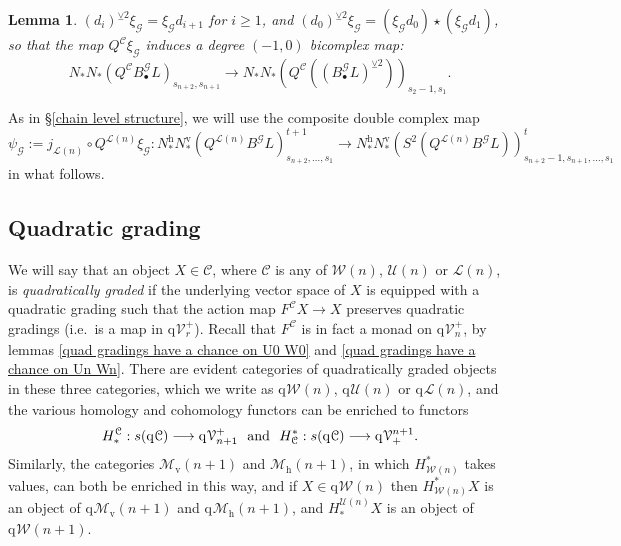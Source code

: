 \documentclass[11pt]{amsart} \renewcommand{\baselinestretch}{1.2}
\theoremstyle{plain}
\newtheorem{lem}[thm]{Lemma}
\theoremstyle{definition}
\renewcommand{\to}{\longrightarrow}
\newcommand{\scrG}{\mathscr{G}}
\newcommand{\calL}{\mathcal{L}}
\newcommand{\calV}{\mathcal{V}}
\newcommand{\calw}{\mathcal{W}}
\newcommand{\calu}{\mathcal{U}}
\newcommand{\call}{\mathcal{L}}
\newcommand{\calc}{\mathcal{C}}
\newcommand{\calMv}{\mathcal{M}\dver}
\newcommand{\calMh}{\mathcal{M}\dhor}
\newcommand{\vect}[2]{\calV^{#1}_{#2}}
\newcommand{\BSW}{{\scrG}}
\newcommand{\BSWres}{B^\BSW}%
\newcommand{\quadgrad}[1]{\mathrm{q}_{#1}}
\newcommand{\uver}{^\mathrm{v}}
\newcommand{\uhor}{^\mathrm{h}}
\newcommand{\dver}{_\mathrm{v}}
\newcommand{\dhor}{_\mathrm{h}}
\newcommand{\smashcoprod}{\veebar}%
\begin{document}
\begin{Composite functor spectral sequences}
\begin{lem}
$(d_i)^{\smashcoprod 2}\xi_\BSW =\xi_\BSW d_{i+1}$ for $i\geq1$, and $(d_0)^{\smashcoprod 2}\xi_\BSW = (\xi_\BSW d_{0})\star(\xi_\BSW d_{1})$, so that the map $Q^{\calc}\xi_\BSW $ induces a degree $(-1,0)$ bicomplex map:
\[N_*N_*(Q^{\calc}B^\BSW_{\bullet}L)_{s_{n+2},s_{n+1}}\to
  N_*N_*(Q^{\calc}((B^\BSW_{\bullet}L)^{\smashcoprod 2}))_{s_2-1,s_1}.\]
\end{lem}
As in \S\ref{chain level structure}, we will use the composite double complex map
\[\psi_\BSW:=j_{\calL(n)}\circ Q^{\calL(n)}\xi_\BSW:N\uhor_*N\uver_*(Q^{\calL(n)}\BSWres L)_{s_{n+2},\ldots,s_1}^{t+1}\to N\uhor_*N\uver_*(S^2(Q^{\calL(n)}\BSWres L))_{s_{n+2}-1,s_{n+1},\ldots,s_1}^{t}\]
in what follows.


\subsection{Quadratic grading}
\label{Quadratic grading}
We will say that an object $X\in\calc$, where $\calc$ is any of $\calw(n)$, $\calu(n)$ or $\call(n)$, is \emph{quadratically graded} if the underlying vector space of $X$ is equipped with a quadratic grading such that the action map
$F^{\calc}X\to X$ 
preserves quadratic gradings (i.e.\ is a map in $\quadgrad{}\vect{+}{r}$).
Recall that $F^{\calc}$ is in fact a monad on $\quadgrad{}\vect{+}{n}$, by lemmas \ref{quad gradings have a chance on U0 W0} and \ref{quad gradings have a chance on Un Wn}. There are evident categories of quadratically graded objects in these three categories, which we write as $\quadgrad{}\calw(n)$, $\quadgrad{}\calu(n)$ or $\quadgrad{}\call(n)$, and the various homology and cohomology functors can be enriched to functors
\[H_*^{\calc}:s(\quadgrad{}\calc)\to \quadgrad{}\vect{+}{n+1}\textup{ \ and \ }H^*_{\calc}:s(\quadgrad{}\calc)\to \quadgrad{}\vect{n+1}{+}.\]
Similarly, the categories $\calMv(n+1)$ and $\calMh(n+1)$, in which $H^*_{\calw(n)}$ takes values, can both be enriched in this way, and if $X\in\quadgrad{}\calw(n)$ then 
$H^*_{\calw(n)}X$ is an object of $\quadgrad{}\calMv(n+1)$ and $\quadgrad{}\calMh(n+1)$, and 
$H_*^{\calu(n)}X$ is an object of $\quadgrad{}\calw(n+1)$.


\end{Composite functor spectral sequences}
\end{document}
